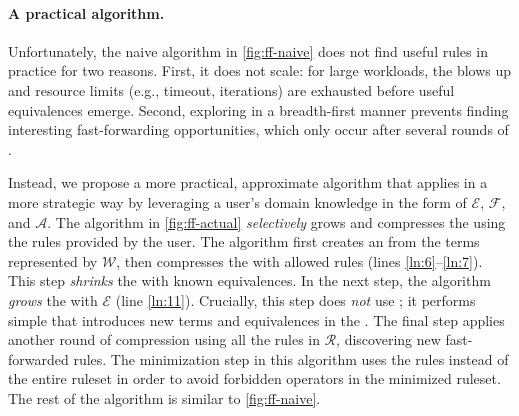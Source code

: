 \paragraph*{A practical algorithm.}
Unfortunately, the naive algorithm in \autoref{fig:ff-naive}
  does not find useful
  rules in practice for two reasons.
First, it does not scale:
  for large workloads, the \egraph blows up and
  resource limits (e.g., timeout, iterations) are exhausted
  before useful equivalences emerge.
Second, exploring in a breadth-first manner
  prevents finding interesting fast-forwarding opportunities,
  which only occur after several rounds of \eqsat.

Instead, we propose a more practical, approximate algorithm
  that applies \eqsat
  in a more strategic way by leveraging a user's domain
  knowledge in the form of $\mathcal{E}$,
  $\mathcal{F}$, and $\mathcal{A}$.
The algorithm in \autoref{fig:ff-actual}
  \textit{selectively} grows and compresses
  the \egraph using the rules provided by the user.
The algorithm first creates an \eggl
  from the terms represented by $\mathcal{W}$,
  then compresses the \egraph with allowed rules
  (lines \ref{ln:6}--\ref{ln:7}).
This step  \textit{shrinks} the \egraph with known
  equivalences.
In the next step,
  the algorithm \textit{grows} the \egraph with
  $\mathcal{E}$ (line \ref{ln:11}).
Crucially, this step does \emph{not} use ;
  it performs simple  that introduces
  new terms and equivalences in the \egraph.
The final \eqsat step applies another round of compression
  using all the rules in $\mathcal{R}$, discovering new
  fast-forwarded rules.
The minimization step in this algorithm
  uses the  rules instead of the entire
  ruleset in order to avoid forbidden operators
  in the minimized ruleset.
The rest of the algorithm is similar to \autoref{fig:ff-naive}.

